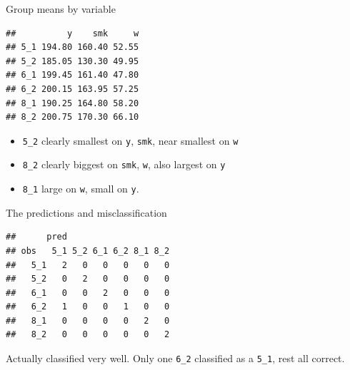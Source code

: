 \documentclass[ignorenonframetext,]{beamer}
\newenvironment{Shaded}{\begin{snugshade}}{\end{snugshade}}
\newcommand{\DataTypeTok}[1]{\textcolor[rgb]{0.13,0.29,0.53}{#1}}
\newcommand{\FloatTok}[1]{\textcolor[rgb]{0.00,0.00,0.81}{#1}}
\newcommand{\KeywordTok}[1]{\textcolor[rgb]{0.13,0.29,0.53}{\textbf{#1}}}
\newcommand{\NormalTok}[1]{#1}
\newcommand{\OperatorTok}[1]{\textcolor[rgb]{0.81,0.36,0.00}{\textbf{#1}}}
\newcommand{\StringTok}[1]{\textcolor[rgb]{0.31,0.60,0.02}{#1}}
\begin{document}
\begin{frame}[fragile]{Group means by variable}
\protect\hypertarget{group-means-by-variable}{}

\begin{Shaded}
\end{Shaded}

\begin{verbatim}
##          y    smk     w
## 5_1 194.80 160.40 52.55
## 5_2 185.05 130.30 49.95
## 6_1 199.45 161.40 47.80
## 6_2 200.15 163.95 57.25
## 8_1 190.25 164.80 58.20
## 8_2 200.75 170.30 66.10
\end{verbatim}

\begin{itemize}
\item
  \texttt{5\_2} clearly smallest on \texttt{y}, \texttt{smk}, near
  smallest on \texttt{w}
\item
  \texttt{8\_2} clearly biggest on \texttt{smk}, \texttt{w}, also
  largest on \texttt{y}
\item
  \texttt{8\_1} large on \texttt{w}, small on \texttt{y}.
\end{itemize}

\end{frame}

\begin{frame}[fragile]{The predictions and misclassification}
\protect\hypertarget{the-predictions-and-misclassification}{}

\begin{Shaded}
\end{Shaded}

\begin{verbatim}
##      pred
## obs   5_1 5_2 6_1 6_2 8_1 8_2
##   5_1   2   0   0   0   0   0
##   5_2   0   2   0   0   0   0
##   6_1   0   0   2   0   0   0
##   6_2   1   0   0   1   0   0
##   8_1   0   0   0   0   2   0
##   8_2   0   0   0   0   0   2
\end{verbatim}

Actually classified very well. Only one \texttt{6\_2} classified as a
\texttt{5\_1}, rest all correct.

\end{frame}
\end{document}

